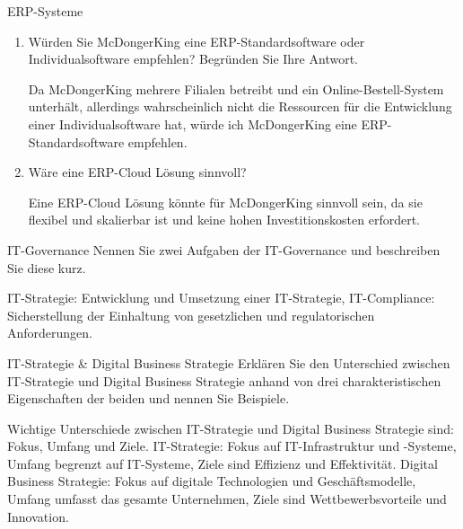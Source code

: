 \documentclass{article}
\begin{document}
\begin{exercise}{ERP-Systeme}
  \begin{enumerate}
    \item Würden Sie McDongerKing eine ERP-Standardsoftware oder Individualsoftware empfehlen? Begründen Sie Ihre Antwort.
          \begin{solution}
            Da McDongerKing mehrere Filialen betreibt und ein Online-Bestell-System unterhält, allerdings wahrscheinlich nicht die Ressourcen für die Entwicklung einer Individualsoftware hat, würde ich McDongerKing eine ERP-Standardsoftware empfehlen.
          \end{solution}
    \item Wäre eine ERP-Cloud Lösung sinnvoll?
          \begin{solution}
            Eine ERP-Cloud Lösung könnte für McDongerKing sinnvoll sein, da sie flexibel und skalierbar ist und keine hohen Investitionskosten erfordert.
          \end{solution}
  \end{enumerate}
\end{exercise}

\begin{exercise}{IT-Governance}
  Nennen Sie zwei Aufgaben der IT-Governance und beschreiben Sie diese kurz.

  \begin{solution}
    IT-Strategie: Entwicklung und Umsetzung einer IT-Strategie, IT-Compliance: Sicherstellung der Einhaltung von gesetzlichen und regulatorischen Anforderungen.
  \end{solution}
\end{exercise}

\begin{exercise}{IT-Strategie \& Digital Business Strategie}
  Erklären Sie den Unterschied zwischen IT-Strategie und Digital Business Strategie anhand von drei charakteristischen Eigenschaften der beiden und nennen Sie Beispiele.

  \begin{solution}
    Wichtige Unterschiede zwischen IT-Strategie und Digital Business Strategie sind: Fokus, Umfang und Ziele. IT-Strategie: Fokus auf IT-Infrastruktur und -Systeme, Umfang begrenzt auf IT-Systeme, Ziele sind Effizienz und Effektivität. Digital Business Strategie: Fokus auf digitale Technologien und Geschäftsmodelle, Umfang umfasst das gesamte Unternehmen, Ziele sind Wettbewerbsvorteile und Innovation.
  \end{solution}
\end{exercise}
\end{document}
